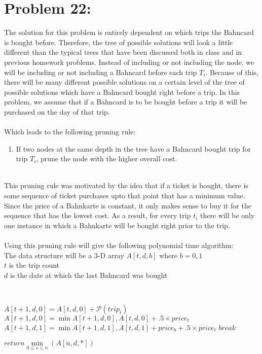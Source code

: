 \documentclass[12pt]{article}
\begin{document}
\section*{Problem 22: }
The solution for this problem is entirely dependent on which trips the Bahncard is bought before.
Therefore, the tree of possible solutions will look a little different than the typical trees that
have been discussed both in class and in previous homework problems. Instead of including or not
including the node, we will be including or not including a Bahncard before each trip $T_i$.
Because of this, there will be many different possible solutions on a certain level of the tree
of possible solutions which have a Bahncard bought right before a trip. In this problem,
we assume that if a Bahncard is to be bought before a trip it will be purchased on the day of that trip.\\\\
Which leads to the following pruning rule:
\begin{enumerate}
\item If two nodes at the same depth in the tree have a Bahncard bought trip for  trip $T_i$, prune the node with the higher overall cost.\\\\
\end{enumerate}
This pruning rule was motivated by the idea that if a ticket is bought, there is
some sequence of ticket purchases upto that point that has a minimum value.  Since
the price of a Bahnkarte is constant, it only makes sense to buy it for the sequence
that has the lowest cost.  As a result, for every trip $t_i$ there will be only
one instance in which a Bahnkarte will be bought right prior to the trip.\\\\
Using this pruning rule will give the following polynomial time algorithm:\\
The data structure will be a 3-D array $A[t, d, b]$ where $b={0,1}$\\
$t$ is the trip count \\
$d$ is the date at which the last Bahncard was bought\\
\begin{algorithm}[H]
\\
{
{
    {
        $A[t+1,d, 0] = A[t,d,0] + \mathcal{P}(trip_t)$\\
        
        {       
            {
                {
                    $A[t+1,d,0] = \min{A[t+1,d,0], A[t,d,0] +.5\times price_t}$
                }
                \Else
                {
                    $A[t+1,d,1] = \min{A[t+1,d,1], A[t,d,1] + price_b +.5\times price_t}$
                }
                $break$
            }
        }                           
        
    }
}
}
{$return \min\limits_{0 \leq s \leq n}(A[n, d, *])$}
\end{algorithm}
\end{document}
